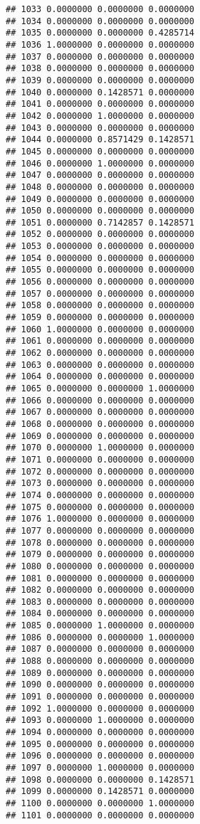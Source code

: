\documentclass[
]{article}
\begin{document}
\begin{verbatim}
## 1033 0.0000000 0.0000000 0.0000000
## 1034 0.0000000 0.0000000 0.0000000
## 1035 0.0000000 0.0000000 0.4285714
## 1036 1.0000000 0.0000000 0.0000000
## 1037 0.0000000 0.0000000 0.0000000
## 1038 0.0000000 0.0000000 0.0000000
## 1039 0.0000000 0.0000000 0.0000000
## 1040 0.0000000 0.1428571 0.0000000
## 1041 0.0000000 0.0000000 0.0000000
## 1042 0.0000000 1.0000000 0.0000000
## 1043 0.0000000 0.0000000 0.0000000
## 1044 0.0000000 0.8571429 0.1428571
## 1045 0.0000000 0.0000000 0.0000000
## 1046 0.0000000 1.0000000 0.0000000
## 1047 0.0000000 0.0000000 0.0000000
## 1048 0.0000000 0.0000000 0.0000000
## 1049 0.0000000 0.0000000 0.0000000
## 1050 0.0000000 0.0000000 0.0000000
## 1051 0.0000000 0.7142857 0.1428571
## 1052 0.0000000 0.0000000 0.0000000
## 1053 0.0000000 0.0000000 0.0000000
## 1054 0.0000000 0.0000000 0.0000000
## 1055 0.0000000 0.0000000 0.0000000
## 1056 0.0000000 0.0000000 0.0000000
## 1057 0.0000000 0.0000000 0.0000000
## 1058 0.0000000 0.0000000 0.0000000
## 1059 0.0000000 0.0000000 0.0000000
## 1060 1.0000000 0.0000000 0.0000000
## 1061 0.0000000 0.0000000 0.0000000
## 1062 0.0000000 0.0000000 0.0000000
## 1063 0.0000000 0.0000000 0.0000000
## 1064 0.0000000 0.0000000 0.0000000
## 1065 0.0000000 0.0000000 1.0000000
## 1066 0.0000000 0.0000000 0.0000000
## 1067 0.0000000 0.0000000 0.0000000
## 1068 0.0000000 0.0000000 0.0000000
## 1069 0.0000000 0.0000000 0.0000000
## 1070 0.0000000 1.0000000 0.0000000
## 1071 0.0000000 0.0000000 0.0000000
## 1072 0.0000000 0.0000000 0.0000000
## 1073 0.0000000 0.0000000 0.0000000
## 1074 0.0000000 0.0000000 0.0000000
## 1075 0.0000000 0.0000000 0.0000000
## 1076 1.0000000 0.0000000 0.0000000
## 1077 0.0000000 0.0000000 0.0000000
## 1078 0.0000000 0.0000000 0.0000000
## 1079 0.0000000 0.0000000 0.0000000
## 1080 0.0000000 0.0000000 0.0000000
## 1081 0.0000000 0.0000000 0.0000000
## 1082 0.0000000 0.0000000 0.0000000
## 1083 0.0000000 0.0000000 0.0000000
## 1084 0.0000000 0.0000000 0.0000000
## 1085 0.0000000 1.0000000 0.0000000
## 1086 0.0000000 0.0000000 1.0000000
## 1087 0.0000000 0.0000000 0.0000000
## 1088 0.0000000 0.0000000 0.0000000
## 1089 0.0000000 0.0000000 0.0000000
## 1090 0.0000000 0.0000000 0.0000000
## 1091 0.0000000 0.0000000 0.0000000
## 1092 1.0000000 0.0000000 0.0000000
## 1093 0.0000000 1.0000000 0.0000000
## 1094 0.0000000 0.0000000 0.0000000
## 1095 0.0000000 0.0000000 0.0000000
## 1096 0.0000000 0.0000000 0.0000000
## 1097 0.0000000 1.0000000 0.0000000
## 1098 0.0000000 0.0000000 0.1428571
## 1099 0.0000000 0.1428571 0.0000000
## 1100 0.0000000 0.0000000 1.0000000
## 1101 0.0000000 0.0000000 0.0000000

\end{verbatim}
\end{document}

